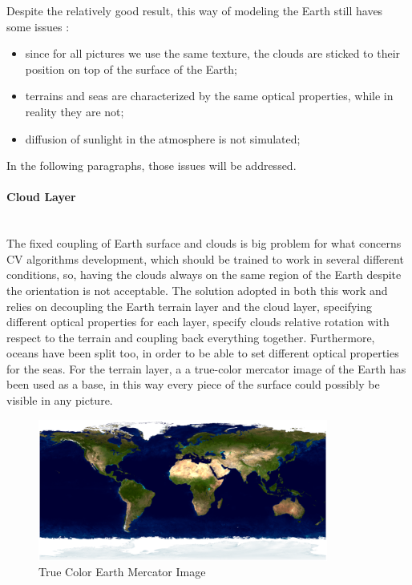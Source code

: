 Despite the relatively good result, this way of modeling the Earth still haves some issues :
\begin{itemize}
  \item since for all pictures we use the same texture, the clouds are sticked to their position on top of the surface of the Earth;
  \item terrains and seas are characterized by the same optical properties, while in reality they are not;
  \item diffusion of sunlight in the atmosphere is not simulated;
\end{itemize}
In the following paragraphs, those issues will be addressed.

\paragraph{Cloud Layer}\mbox{}\\
The fixed coupling of Earth surface and clouds is big problem for what concerns CV algorithms development, which should be trained to work in several different conditions, so, having the clouds always on the same region of the Earth despite the orientation is not acceptable.
The solution adopted in both this work and \cite{jacopo} relies on decoupling the Earth terrain layer and the cloud layer, specifying different optical properties for each layer, specify clouds relative rotation with respect to the terrain and coupling back everything together.
Furthermore, oceans have been split too, in order to be able to set different optical properties for the seas.
For the terrain layer, a a true-color mercator image of the Earth has been used as a base, in this way every piece of the surface could possibly be visible in any picture.

\begin{figure}[htbp]
  \centering
  \includegraphics[width=0.85\textwidth]{gfx/earthMercator.eps}
  \caption{True Color Earth Mercator Image \cite{bluemarble}}
  \label{fig:EarthMercator}
\end{figure}

